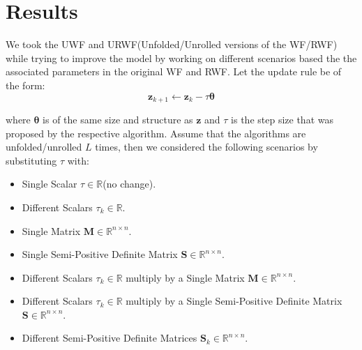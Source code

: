 \chapter{Results}

We took the \ac{UWF} and \ac{URWF}(Unfolded/Unrolled versions of the \ac{WF}/\ac{RWF}) while trying to improve the model by working on different scenarios 
based the the associated parameters in the original \ac{WF} and \ac{RWF}. Let the update rule be of the form:
\begin{equation*}
  \boldsymbol{z}_{k+1} \leftarrow \boldsymbol{z}_k - \tau\boldsymbol{\theta}
\end{equation*}

where $\boldsymbol{\theta}$ is of the same size and structure as $\boldsymbol{z}$ and $\tau$ is the step size that was proposed by the respective algorithm. Assume that the algorithms are unfolded/unrolled $L$ times, then we considered the following 
scenarios by substituting $\tau$ with:

\begin{itemize}
  \item Single Scalar $\tau \in \mathbb{R}$(no change).
  \item Different Scalars $\tau_k\in\mathbb{R}$.
  \item Single Matrix $\boldsymbol{M}\in \mathbb{R}^{n\times n}$.
  \item Single Semi-Positive Definite Matrix $\boldsymbol{S}\in \mathbb{R}^{n\times n}$.
  \item Different Scalars $\tau_k \in \mathbb{R}$ multiply by a Single Matrix $\boldsymbol{M} \in \mathbb{R}^{n\times n}$.
  \item Different Scalars $\tau_k \in \mathbb{R}$ multiply by a Single Semi-Positive Definite Matrix $\boldsymbol{S} \in \mathbb{R}^{n\times n}$.
  \item Different Semi-Positive Definite Matrices $\boldsymbol{S}_k\in \mathbb{R}^{n\times n}$.
\end{itemize}

